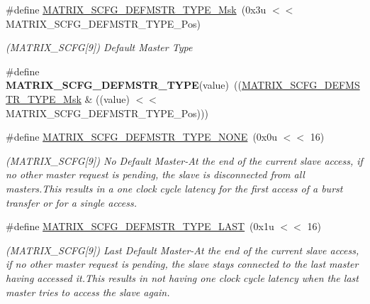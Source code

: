 \begin{DoxyCompactItemize}
\item 
\mbox{\label{group__SAMV71__MATRIX_gae095872b0c604d21a97b49e765aa007a}} 
\#define \mbox{\hyperlink{group__SAMV71__MATRIX_gae095872b0c604d21a97b49e765aa007a}{M\+A\+T\+R\+I\+X\+\_\+\+S\+C\+F\+G\+\_\+\+D\+E\+F\+M\+S\+T\+R\+\_\+\+T\+Y\+P\+E\+\_\+\+Msk}}~(0x3u $<$$<$ M\+A\+T\+R\+I\+X\+\_\+\+S\+C\+F\+G\+\_\+\+D\+E\+F\+M\+S\+T\+R\+\_\+\+T\+Y\+P\+E\+\_\+\+Pos)
\begin{DoxyCompactList}\small\item\em (M\+A\+T\+R\+I\+X\+\_\+\+S\+C\+FG\mbox{[}9\mbox{]}) Default Master Type \end{DoxyCompactList}\item 
\mbox{\label{group__SAMV71__MATRIX_ga985c6bcc1fdaf9a7b2ac870130b36033}} 
\#define {\bfseries M\+A\+T\+R\+I\+X\+\_\+\+S\+C\+F\+G\+\_\+\+D\+E\+F\+M\+S\+T\+R\+\_\+\+T\+Y\+PE}(value)~((\mbox{\hyperlink{group__SAMV71__MATRIX_gae095872b0c604d21a97b49e765aa007a}{M\+A\+T\+R\+I\+X\+\_\+\+S\+C\+F\+G\+\_\+\+D\+E\+F\+M\+S\+T\+R\+\_\+\+T\+Y\+P\+E\+\_\+\+Msk}} \& ((value) $<$$<$ M\+A\+T\+R\+I\+X\+\_\+\+S\+C\+F\+G\+\_\+\+D\+E\+F\+M\+S\+T\+R\+\_\+\+T\+Y\+P\+E\+\_\+\+Pos)))
\item 
\mbox{\label{group__SAMV71__MATRIX_gaa6edc1efa8f3fc131a2c48d959df99e4}} 
\#define \mbox{\hyperlink{group__SAMV71__MATRIX_gaa6edc1efa8f3fc131a2c48d959df99e4}{M\+A\+T\+R\+I\+X\+\_\+\+S\+C\+F\+G\+\_\+\+D\+E\+F\+M\+S\+T\+R\+\_\+\+T\+Y\+P\+E\+\_\+\+N\+O\+NE}}~(0x0u $<$$<$ 16)
\begin{DoxyCompactList}\small\item\em (M\+A\+T\+R\+I\+X\+\_\+\+S\+C\+FG\mbox{[}9\mbox{]}) No Default Master-\/\+At the end of the current slave access, if no other master request is pending, the slave is disconnected from all masters.\+This results in a one clock cycle latency for the first access of a burst transfer or for a single access. \end{DoxyCompactList}\item 
\mbox{\label{group__SAMV71__MATRIX_gab6309467f784a362e9f4909995aa6c95}} 
\#define \mbox{\hyperlink{group__SAMV71__MATRIX_gab6309467f784a362e9f4909995aa6c95}{M\+A\+T\+R\+I\+X\+\_\+\+S\+C\+F\+G\+\_\+\+D\+E\+F\+M\+S\+T\+R\+\_\+\+T\+Y\+P\+E\+\_\+\+L\+A\+ST}}~(0x1u $<$$<$ 16)
\begin{DoxyCompactList}\small\item\em (M\+A\+T\+R\+I\+X\+\_\+\+S\+C\+FG\mbox{[}9\mbox{]}) Last Default Master-\/\+At the end of the current slave access, if no other master request is pending, the slave stays connected to the last master having accessed it.\+This results in not having one clock cycle latency when the last master tries to access the slave again. \end{DoxyCompactList}\item 

\end{DoxyCompactItemize}
